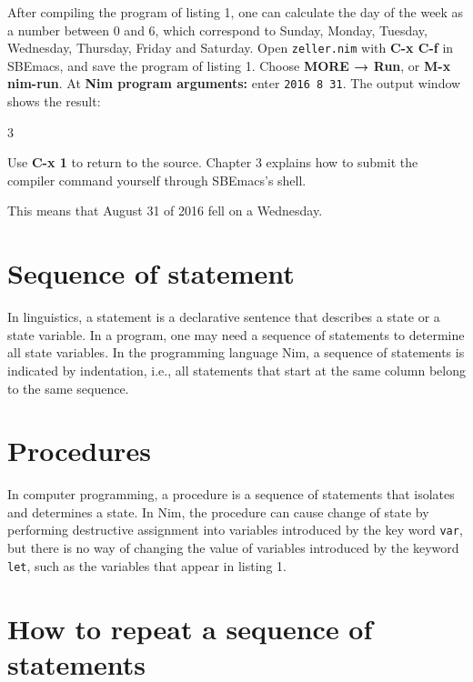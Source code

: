 \documentclass[
  12pt,
]{book}
\newenvironment{Shaded}{}{}
\newcommand{\NormalTok}[1]{#1}
\begin{document}
After compiling the program of listing 1, one can calculate the day of
the week as a number between 0 and 6, which correspond to Sunday,
Monday, Tuesday, Wednesday, Thursday, Friday and Saturday. Open
\texttt{zeller.nim} with \textbf{C-x C-f} in SBEmacs, and save the
program of listing 1. Choose \textbf{MORE → Run}, or \textbf{M-x
nim-run}. At \textbf{Nim program arguments:} enter \texttt{2016\ 8\ 31}.
The output window shows the result:

\begin{Shaded}
\begin{Highlighting}[]
\NormalTok{3}
\end{Highlighting}
\end{Shaded}

Use \textbf{C-x 1} to return to the source. Chapter 3 explains how to
submit the compiler command yourself through SBEmacs's shell.

This means that August 31 of 2016 fell on a Wednesday.

\section{Sequence of statement}\label{sequence-of-statement}

In linguistics, a statement is a declarative sentence that describes a
state or a state variable. In a program, one may need a sequence of
statements to determine all state variables. In the programming language
Nim, a sequence of statements is indicated by indentation, i.e., all
statements that start at the same column belong to the same sequence.

\section{Procedures}\label{procedures}

In computer programming, a procedure is a sequence of statements that
isolates and determines a state. In Nim, the procedure can cause change
of state by performing destructive assignment into variables introduced
by the key word \texttt{var}, but there is no way of changing the value
of variables introduced by the keyword \texttt{let}, such as the
variables that appear in listing 1.

\section{How to repeat a sequence of
statements}\label{how-to-repeat-a-sequence-of-statements}
\end{document}
